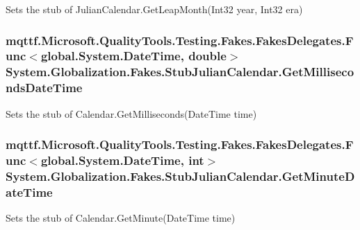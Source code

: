 Sets the stub of Julian\-Calendar.\-Get\-Leap\-Month(\-Int32 year, Int32 era)

\hypertarget{class_system_1_1_globalization_1_1_fakes_1_1_stub_julian_calendar_a40c9a1bd8c24e2f6a45fdf3c848a19e4}{
\subsubsection[{Get\-Milliseconds\-Date\-Time}]{\setlength{\rightskip}{0pt plus 5cm}mqttf.\-Microsoft.\-Quality\-Tools.\-Testing.\-Fakes.\-Fakes\-Delegates.\-Func$<$global.\-System.\-Date\-Time, double$>$ System.\-Globalization.\-Fakes.\-Stub\-Julian\-Calendar.\-Get\-Milliseconds\-Date\-Time}}\label{class_system_1_1_globalization_1_1_fakes_1_1_stub_julian_calendar_a40c9a1bd8c24e2f6a45fdf3c848a19e4}


Sets the stub of Calendar.\-Get\-Milliseconds(\-Date\-Time time)

\hypertarget{class_system_1_1_globalization_1_1_fakes_1_1_stub_julian_calendar_a8d7103b2f9ff5aa44d00d06e9a8e809a}{
\subsubsection[{Get\-Minute\-Date\-Time}]{\setlength{\rightskip}{0pt plus 5cm}mqttf.\-Microsoft.\-Quality\-Tools.\-Testing.\-Fakes.\-Fakes\-Delegates.\-Func$<$global.\-System.\-Date\-Time, int$>$ System.\-Globalization.\-Fakes.\-Stub\-Julian\-Calendar.\-Get\-Minute\-Date\-Time}}\label{class_system_1_1_globalization_1_1_fakes_1_1_stub_julian_calendar_a8d7103b2f9ff5aa44d00d06e9a8e809a}


Sets the stub of Calendar.\-Get\-Minute(\-Date\-Time time)

